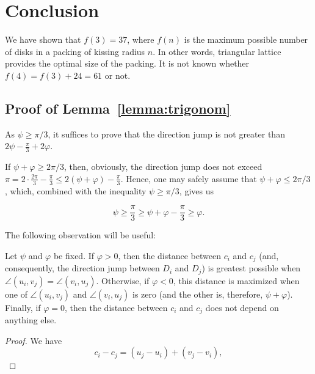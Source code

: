 \section{Conclusion}

We have shown that $f(3) = 37$, where $f(n)$ is the maximum possible number of disks in a packing of kissing radius $n$. In other words, triangular lattice provides the optimal size of the packing. It is not known whether $f(4) = f(3) + 24 = 61$ or not.




\newpage

\begin{appendices}

\section{Proof of Lemma~\ref{lemma:trigonom}}\label{section:trigonom-proof}

As $\psi\geq\pi/3$, it suffices to prove that the direction jump is not greater than $2\psi - \frac{\pi}{3} + 2\varphi$.

If $\psi + \varphi\geq 2\pi/3$, then, obviously, the direction jump does not exceed $\pi = 2\cdot\frac{2\pi}{3} - \frac{\pi}{3}\leq 2(\psi + \varphi) - \frac{\pi}{3}$. Hence, one may safely assume that $\psi + \varphi\leq 2\pi/3$, which, combined with the inequality $\psi\geq\pi/3$, gives us

\begin{equation}
\label{eq:straighten}
\psi \geq \frac{\pi}{3}\geq \psi + \varphi - \frac{\pi}{3}\geq \varphi.\tag{$\star$}
\end{equation}

The following observation will be useful:

\begin{observation}
Let $\psi$ and $\varphi$ be fixed. If $\varphi > 0$, then the distance between $c_i$ and $c_j$ (and, consequently, the direction jump between $D_i$ and $D_j$) is greatest possible when $\angle(u_i, v_j) = \angle(v_i, u_j)$. Otherwise, if $\varphi < 0$, this distance is maximized when one of $\angle(u_i, v_j)$ and $\angle(v_i, u_j)$ is zero (and the other is, therefore, $\psi + \varphi$). Finally, if $\varphi = 0$, then the distance between $c_i$ and $c_j$ does not depend on anything else.
\end{observation}

\begin{proof}
We have
$$c_i - c_j = (u_j - u_i) + (v_j - v_i),$$


\end{proof}
\end{appendices}
